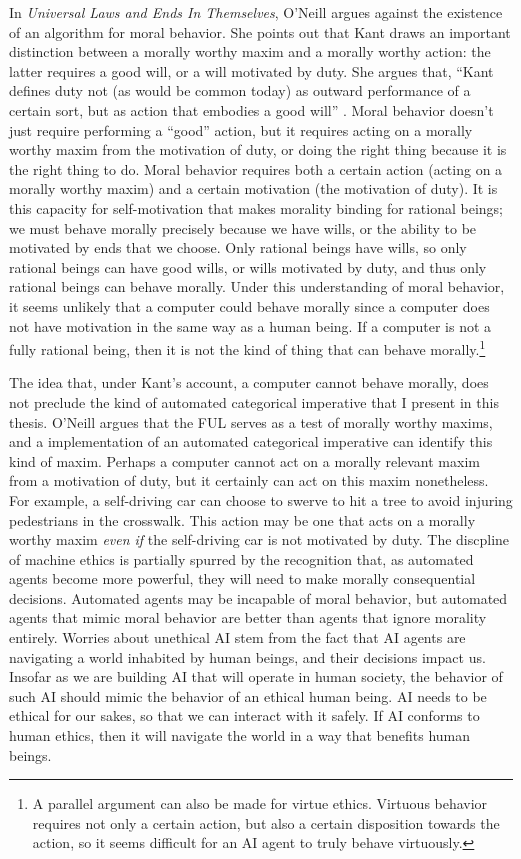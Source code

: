 \begin{isabellebody}
\begin{isamarkuptext}
In \emph{Universal Laws and Ends In Themselves}, O'Neill argues against the existence of an algorithm for
moral behavior. She points out that Kant draws an important distinction between a morally worthy maxim
and a morally worthy action: the latter requires a good will, or a will motivated by duty. She argues that, 
``Kant defines duty not (as would be common today) as outward performance of a certain sort, but as action
that embodies a good will'' \citep[345]{oneilluniversallaws}. Moral behavior doesn't just require performing
a ``good'' action, but it requires acting on a morally worthy maxim from the motivation of duty, or 
doing the right thing because it is the right thing to do. Moral behavior requires both a certain action 
(acting on a morally worthy maxim) and a certain motivation (the motivation of duty). It is this capacity 
for self-motivation that makes morality binding for rational beings; we must behave morally precisely 
because we have wills, or the ability to be motivated by ends
that we choose. Only rational beings have wills, so only rational beings can have good wills, or wills
motivated by duty, and thus only rational beings can behave morally. Under this understanding
of moral behavior, it seems unlikely that a computer could behave morally
since a computer does not have motivation in the same way as a human being. If a computer is not a fully rational
being, then it is not the kind of thing that can behave morally.\footnote{A parallel argument can also be made for virtue ethics. Virtuous
behavior requires not only a certain action, but also a certain disposition towards the action, so it seems
difficult for an AI agent to truly behave virtuously.}

The idea that, under Kant's account, a computer cannot behave morally, does not preclude the kind 
of automated categorical imperative that I present in this thesis. O'Neill argues that the FUL
serves as a test of morally worthy maxims, and a implementation of an automated categorical imperative can 
identify this kind of maxim. Perhaps a computer cannot act on a morally relevant maxim from a motivation of duty, 
but it certainly can act on this maxim nonetheless. For example, a self-driving car can choose to swerve to hit a tree
to avoid injuring pedestrians in the crosswalk. This action may be one that acts on a morally worthy maxim
\emph{even if} the self-driving car is not motivated by duty. The discpline of machine ethics is partially
spurred by the recognition that, as automated agents become more powerful, they will need to make
morally consequential decisions. Automated agents may be incapable of moral behavior, but automated agents that mimic
moral behavior are better than agents that ignore morality entirely. Worries about unethical AI
stem from the fact that AI agents are navigating a world inhabited by human beings, and their decisions
impact us. Insofar as we are building AI that will operate in human society, the behavior of such AI 
should mimic the behavior of an ethical human being. AI needs to be ethical for our sakes, so that we 
can interact with it safely. If AI conforms to human ethics, then it will navigate the world
in a way that benefits human beings.


\end{isamarkuptext}
\end{isabellebody}

